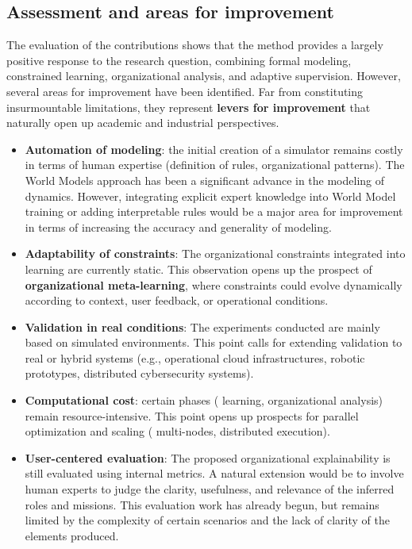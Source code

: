 \subsection*{Assessment and areas for improvement}
The evaluation of the contributions shows that the  method provides a largely positive response to the research question, combining formal modeling, constrained learning, organizational analysis, and adaptive supervision.
However, several areas for improvement have been identified. Far from constituting insurmountable limitations, they represent \textbf{levers for improvement} that naturally open up academic and industrial perspectives.
\begin{itemize}
  \item \textbf{Automation of modeling}: the initial creation of a simulator remains costly in terms of human expertise (definition of rules, organizational patterns). The World Models approach has been a significant advance in the modeling of dynamics. However, integrating explicit expert knowledge into World Model training or adding interpretable rules would be a major area for improvement in terms of increasing the accuracy and generality of modeling.
  \item \textbf{Adaptability of constraints}: The organizational constraints integrated into learning are currently static. This observation opens up the prospect of \textbf{organizational meta-learning}, where constraints could evolve dynamically according to context, user feedback, or operational conditions.
  \item \textbf{Validation in real conditions}: The experiments conducted are mainly based on simulated environments. This point calls for extending validation to real or hybrid systems (e.g., operational cloud infrastructures, robotic prototypes, distributed cybersecurity systems).
  \item \textbf{Computational cost}: certain phases ( learning,  organizational analysis) remain resource-intensive. This point opens up prospects for parallel optimization and scaling ( multi-nodes, distributed execution).
  \item \textbf{User-centered evaluation}: The proposed organizational explainability is still evaluated using internal metrics. A natural extension would be to involve human experts to judge the clarity, usefulness, and relevance of the inferred roles and missions. This evaluation work has already begun, but remains limited by the complexity of certain scenarios and the lack of clarity of the elements produced.
\end{itemize}

